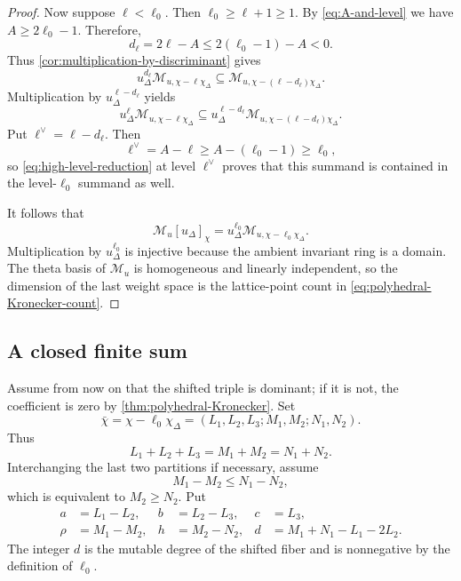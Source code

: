 \documentclass[11pt,reqno]{amsart}
\numberwithin{equation}{section}
\theoremstyle{remark}
\newcommand{\Mu}{\mathcal M_u}
\newcommand{\Muwt}[1]{\mathcal M_{u,#1}}
\newcommand{\udisc}{u_{\Delta}}
\begin{document}
\begin{proof}
Now suppose $\ell<\ell_0$. Then $\ell_0 \ge \ell + 1 \ge 1$. By \eqref{eq:A-and-level} we have $A \ge 2\ell_0 - 1$. Therefore, 
\[d_\ell = 2\ell - A \le 2(\ell_0 - 1) - A < 0.\]
Thus \cref{cor:multiplication-by-discriminant} gives
\[ \udisc^{d_\ell}\Muwt{\chi-\ell\chi_\Delta} \subseteq \Muwt{\chi-(\ell - d_\ell)\chi_\Delta}. \]
Multiplication by $\udisc^{\ell - d_\ell}$ yields
\[ \udisc^\ell\Muwt{\chi-\ell\chi_\Delta} \subseteq \udisc^{\ell - d_\ell} \Muwt{\chi-(\ell - d_\ell)\chi_\Delta}. \]
Put $\ell^\vee=\ell-d_\ell$. Then 
\[\ell^\vee = A-\ell \ge A - (\ell_0 - 1) \ge \ell_0,\] 
so \eqref{eq:high-level-reduction} at level $\ell^\vee$ proves that this summand is contained in
the level-$\ell_0$ summand as well.

It follows that
\[ \Mu[\udisc]_\chi =\udisc^{\ell_0}\Muwt{\chi-\ell_0\chi_\Delta}. \]
Multiplication by $\udisc^{\ell_0}$ is injective because the ambient
invariant ring is a domain.  The theta basis of $\Mu$ is homogeneous and
linearly independent, so the dimension of the last weight space is the
lattice-point count in \eqref{eq:polyhedral-Kronecker-count}.
\end{proof}

\subsection{A closed finite sum}

Assume from now on that the shifted triple is dominant; if it is not, the
coefficient is zero by \cref{thm:polyhedral-Kronecker}.  Set
\begin{equation}
\label{eq:shifted-weight}
 \bar\chi=\chi-\ell_0\chi_\Delta
 =(L_1,L_2,L_3;M_1,M_2;N_1,N_2).
\end{equation}
Thus
\[ L_1+L_2+L_3=M_1+M_2=N_1+N_2. \]
Interchanging the last two partitions if necessary, assume
\[ M_1-M_2\le N_1-N_2, \]
which is equivalent to $M_2\ge N_2$.  Put
\begin{equation}
\label{eq:closed-form-parameters}
 \begin{aligned}
 a&=L_1-L_2,& b&=L_2-L_3,& c&=L_3,\\
 \rho&=M_1-M_2,& h&=M_2-N_2,&d&=M_1+N_1-L_1-2L_2.
 \end{aligned}
\end{equation}
The integer $d$ is the mutable degree of the shifted fiber and is
nonnegative by the definition of $\ell_0$.
\end{document}
